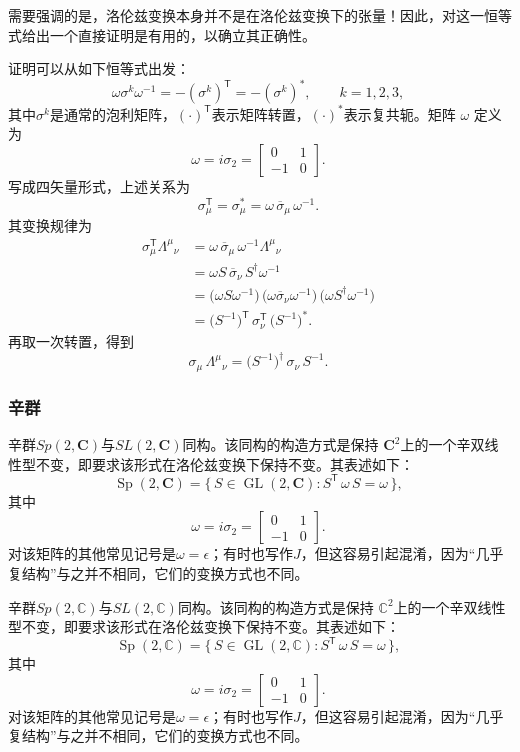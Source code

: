 需要强调的是，洛伦兹变换本身并不是在洛伦兹变换下的张量！因此，对这一恒等式给出一个直接证明是有用的，以确立其正确性。

证明可以从如下恒等式出发：
\[
\omega \sigma^{k} \omega^{-1} = -(\sigma^{k})^{\textsf{T}} = -(\sigma^{k})^{*}, \qquad k = 1,2,3,~
\]
其中$\sigma^{k}$是通常的泡利矩阵，$(\cdot)^{\textsf{T}}$表示矩阵转置，$(\cdot)^{*}$表示复共轭。矩阵 $\omega$ 定义为
\[
\omega = i\sigma_{2} =
\begin{bmatrix}
0 & 1 \\
-1 & 0
\end{bmatrix}.~
\]
写成四矢量形式，上述关系为
\[
\sigma_{\mu}^{\textsf{T}} = \sigma_{\mu}^{*} = \omega \,\overline{\sigma}_{\mu}\, \omega^{-1}.~
\]
其变换规律为
\[
\begin{aligned}
\sigma_{\mu}^{\textsf{T}} {\Lambda^{\mu}}_{\nu}
&= \omega \,\overline{\sigma}_{\mu}\, \omega^{-1} {\Lambda^{\mu}}_{\nu} \\
&= \omega S \,\overline{\sigma}_{\nu}\, S^{\dagger} \omega^{-1} \\
&= \bigl(\omega S \omega^{-1}\bigr)\, \bigl(\omega \overline{\sigma}_{\nu} \omega^{-1}\bigr)\, \bigl(\omega S^{\dagger} \omega^{-1}\bigr) \\
&= \bigl(S^{-1}\bigr)^{\textsf{T}} \,\sigma_{\nu}^{\textsf{T}}\, \bigl(S^{-1}\bigr)^{*}.
\end{aligned}~
\]
再取一次转置，得到
\[
\sigma_{\mu}\,{\Lambda^{\mu}}_{\nu} = \bigl(S^{-1}\bigr)^{\dagger}\,\sigma_{\nu}\,S^{-1}.~
\]
\subsubsection{辛群}
辛群$Sp(2,\mathbf{C})$与$SL(2,\mathbf{C})$同构。该同构的构造方式是保持 $\mathbf{C}^{2}$上的一个辛双线性型不变，即要求该形式在洛伦兹变换下保持不变。其表述如下：
\[
\operatorname{Sp}(2,\mathbf{C})
= \{\, S \in \operatorname{GL}(2,\mathbf{C}) : S^{\textsf{T}} \,\omega\, S = \omega \,\},~
\]
其中
\[
\omega = i\sigma_{2} =
\begin{bmatrix}
0 & 1 \\
-1 & 0
\end{bmatrix}.~
\]
对该矩阵的其他常见记号是$\omega = \epsilon$；有时也写作$J$，但这容易引起混淆，因为“几乎复结构”与之并不相同，它们的变换方式也不同。

辛群$Sp(2,\mathbb{C})$与$SL(2,\mathbb{C})$同构。该同构的构造方式是保持 $\mathbb{C}^{2}$上的一个辛双线性型不变，即要求该形式在洛伦兹变换下保持不变。其表述如下：
\[
\operatorname{Sp}(2,\mathbb{C})
= \{\, S \in \operatorname{GL}(2,\mathbb{C}) : S^{\textsf{T}} \,\omega\, S = \omega \,\},~
\]
其中
\[
\omega = i\sigma_{2} =
\begin{bmatrix}
0 & 1 \\
-1 & 0
\end{bmatrix}.~
\]
对该矩阵的其他常见记号是$\omega = \epsilon$；有时也写作$J$，但这容易引起混淆，因为“几乎复结构”与之并不相同，它们的变换方式也不同。
